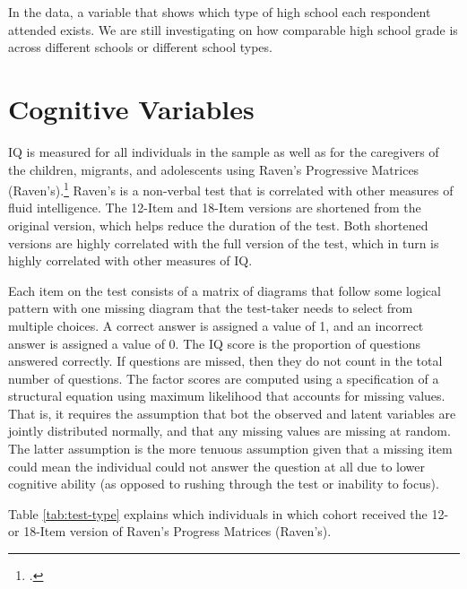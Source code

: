In the data, a variable that shows which type of high school each respondent attended exists. We are still investigating on how comparable high school grade is across different schools or different school types. 

\section{Cognitive Variables}
\label{sec:cog}

IQ is measured for all individuals in the sample as well as for the caregivers of the children, migrants, and adolescents using Raven's Progressive Matrices (Raven's).\footnote{\citet{Raven_Raven_etal_1988_BOOKManualRavensprogressive}.} Raven's is a non-verbal test that is correlated with other measures of fluid intelligence. The 12-Item and 18-Item versions are shortened from the original version, which helps reduce the duration of the test. Both shortened versions are highly correlated with the full version of the test, which in turn is highly correlated with other measures of IQ.

Each item on the test consists of a matrix of diagrams that follow some logical pattern with one missing diagram that the test-taker needs to select from multiple choices. A correct answer is assigned a value of 1, and an incorrect answer is assigned a value of 0. The IQ score is the proportion of questions answered correctly. If questions are missed, then they do not count in the total number of questions. The factor scores are computed using a specification of a structural equation using maximum likelihood that accounts for missing values. That is, it requires the assumption that bot the observed and latent variables are jointly distributed normally, and that any missing values are missing at random. The latter assumption is the more tenuous assumption given that a missing item could mean the individual could not answer the question at all due to lower cognitive ability (as opposed to rushing through the test or inability to focus).

 Table \ref{tab:test-type} explains which individuals in which cohort received the 12- or 18-Item version of Raven's Progress Matrices (Raven's).

